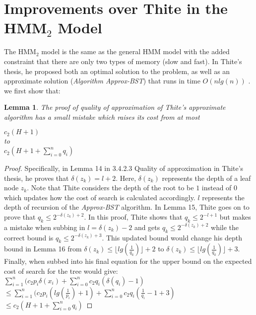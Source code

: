 \documentclass[letterpaper,12pt,titlepage,oneside,final]{book}
\theoremstyle{plain}
\newtheorem{lem}[thm]{Lemma}
\begin{document}
\section{Improvements over Thite in the HMM$_2$ Model}

The HMM$_2$ model is the same as the general HMM model with the added constraint that there are only two types of memory (slow and fast). In Thite's thesis, he proposed both an optimal solution to the problem, as well as an approximate solution (\textit{Algorithm Approx-BST}) that runs in time $O(n lg(n))$ \cite{thite2008optimum}. we first show that:
\begin{lem}
The proof of quality of approximation of Thite's approximate algorithm has a small mistake which raises its cost from at most \\
\begin{center}
$c_2(H+1)$\\
to \\
$c_2(H+1+\sum_{i=0}^{n}q_i)$
\end{center}
\end{lem}

\begin{proof}
Specifically, in Lemma 14 in 3.4.2.3 Quality of approximation in Thite's thesis, he proves that $\delta(z_k) = l+2$. Here, $\delta(z_k)$ represents the depth of a leaf node $z_k$. Note that Thite considers the depth of the root to be $1$ instead of $0$ which updates how the cost of search is calculated accordingly. $l$ represents the depth of recursion of the \textit{Approx-BST} algorithm. In Lemma 15, Thite goes on to prove that $q_k \leq 2^{-\delta(z_k)+2}$. In this proof, Thite shows that $q_k \leq 2^{-l+1}$ but makes a mistake when subbing in $l=\delta(z_k)-2$ and gets $q_k \leq 2^{-\delta(z_k)+2}$ while the correct bound is $q_k \leq 2^{-\delta(z_k)+3}$. This updated bound would change his depth bound in Lemma 16 from $\delta(z_k) \leq \lfloor lg(\frac{1}{q_k}) \rfloor + 2$ to $\delta(z_k) \leq \lfloor lg(\frac{1}{q_k}) \rfloor + 3$. Finally, when subbed into his final equation for the upper bound on the expected cost of search for the tree would give: \\

$\sum_{i=1}^{n}(c_2 p_i \delta(x_i )+ \sum_{i=0}^{n} c_2 q_i (\delta(q_i)-1)$ \\

$\leq \sum_{i=1}^{n}(c_2 p_i (lg(\frac{1}{p_i})+1)+ \sum_{i=0}^{n} c_2 q_i (\frac{1}{q_i}-1+3)$ \\

$\leq c_2(H+1+\sum_{i=0}^{n}q_i)$
\end{proof}
\end{document}
